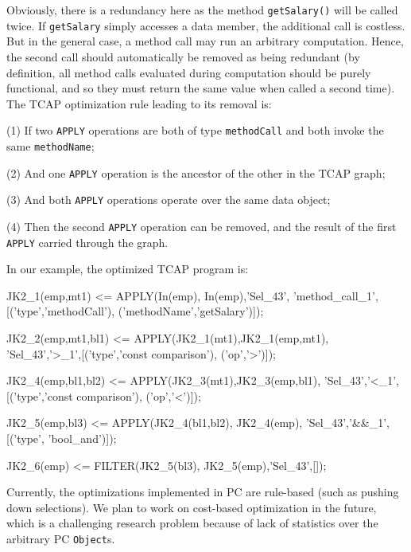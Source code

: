 Obviously, there is a redundancy here as the method \texttt{getSalary()} will be called twice.
If \texttt{getSalary} simply accesses a data member, the additional
call is costless.  But in the general case, a method call may run an arbitrary
computation.  Hence, the second call should automatically be removed as being redundant 
(by definition, all method calls evaluated during computation should
be purely functional, and so they must return the same value when called a second time).
The TCAP optimization rule leading to its removal is:

\vspace{5pt}

\noindent
(1) If two \texttt{APPLY} operations are both of type \texttt{methodCall} and both invoke the same \texttt{methodName};

\noindent
(2) And one \texttt{APPLY} operation is the ancestor of the other in the TCAP graph;

\noindent
(3) And both \texttt{APPLY} operations operate over the same data object;

\noindent
(4) Then the second \texttt{APPLY} operation can be removed, and the
result of the first \texttt{APPLY} carried through the graph.

\vspace{5pt}

\noindent
In our example, the
optimized
TCAP program is:

\begin{codesmall}
JK2_1(emp,mt1) <= APPLY(In(emp), In(emp),'Sel_43', 
  'method_call_1',[('type','methodCall'),
  ('methodName','getSalary')]);

JK2_2(emp,mt1,bl1) <= APPLY(JK2_1(mt1),JK2_1(emp,mt1), 
  'Sel_43','>_1',[('type','const comparison'),
  ('op','>')]);

JK2_4(emp,bl1,bl2) <= APPLY(JK2_3(mt1),JK2_3(emp,bl1),
  'Sel_43','<_1',[('type','const comparison'),
  ('op','<')]);

JK2_5(emp,bl3) <= APPLY(JK2_4(bl1,bl2), JK2_4(emp), 
  'Sel_43','&&_1',[('type', 'bool_and')]);

JK2_6(emp) <= FILTER(JK2_5(bl3), JK2_5(emp),'Sel_43',[]);
  
\end{codesmall}

\noindent
Currently, the optimizations implemented in PC are rule-based (such as pushing down selections).  We plan to work on cost-based optimization
in the future, which is a challenging research problem because of lack of statistics over the arbitrary PC \texttt{Object}s.
